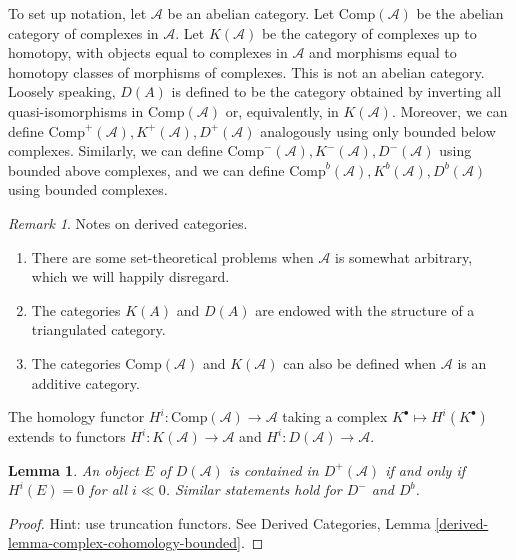 \documentclass{stacks-project}
\theoremstyle{plain}
\newtheorem{lemma}[subsection]{Lemma}
\theoremstyle{definition}
\theoremstyle{remark}
\newtheorem{remark}[subsection]{Remark}
\numberwithin{equation}{subsection}
\begin{document}
\noindent
To set up notation, let $\mathcal{A}$ be an abelian category. Let
$\text{Comp}(\mathcal{A})$ be the abelian category of complexes in
$\mathcal{A}$. Let $K(\mathcal{A})$ be the category of complexes up to
homotopy, with objects equal to complexes in $\mathcal{A}$ and morphisms
equal to
homotopy classes of morphisms of complexes. This is not an abelian category.
Loosely speaking, $D(A)$ is defined to be the category obtained by inverting
all quasi-isomorphisms in $\text{Comp}(\mathcal{A})$ or, equivalently, in
$K(\mathcal{A})$. Moreover, we can define $\text{Comp}^+(\mathcal{A}),
K^+(\mathcal{A}), D^+(\mathcal{A})$ analogously using only bounded below
complexes. Similarly, we can define $\text{Comp}^-(\mathcal{A}),
K^-(\mathcal{A}), D^-(\mathcal{A})$ using bounded above complexes, and we can
define $\text{Comp}^b(\mathcal{A}), K^b(\mathcal{A}), D^b(\mathcal{A})$ using
bounded complexes.

\begin{remark}
\label{remarks-derived-categories}
Notes on derived categories.
\begin{enumerate}
\item
There are some set-theoretical problems when $\mathcal{A}$ is somewhat
arbitrary, which we will happily disregard.
\item
The categories $K(A)$ and $D(A)$ are endowed with the structure of a
triangulated category.
\item
The categories $\text{Comp}(\mathcal{A})$ and $K(\mathcal{A})$ can also be
defined when $\mathcal{A}$ is an additive category.
\end{enumerate}
\end{remark}

\noindent
The homology functor $H^i : \text{Comp}(\mathcal{A}) \to \mathcal{A}$ taking a
complex $K^\bullet \mapsto H^i(K^\bullet)$ extends to functors $H^i :
K(\mathcal{A}) \to \mathcal{A}$ and $H^i : D(\mathcal{A}) \to \mathcal{A}$.

\begin{lemma}
\label{lemma-when-in-bounded}
An object $E$ of $D(\mathcal{A})$ is contained in $D^+(\mathcal{A})$ if and
only if $H^i(E) =0 $ for all $i \ll 0$. Similar statements hold for $D^-$ and
$D^b$.
\end{lemma}

\begin{proof}
Hint: use truncation functors. See
Derived Categories, Lemma \ref{derived-lemma-complex-cohomology-bounded}.
\end{proof}
\end{document}

